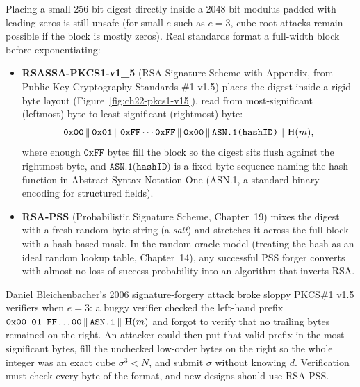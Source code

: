 \begin{trapbox}
Placing a small 256-bit digest directly inside a 2048-bit modulus padded with leading zeros is still unsafe (for small $e$ such as $e = 3$, cube-root attacks remain possible if the block is mostly zeros). Real standards format a full-width block before exponentiating:
\begin{itemize}
  \item \textbf{RSASSA-PKCS1-v1\_5} (RSA Signature Scheme with Appendix, from Public-Key Cryptography Standards \#1 v1.5) places the digest inside a rigid byte layout (Figure~\ref{fig:ch22-pkcs1-v15}), read from most-significant (leftmost) byte to least-significant (rightmost) byte:
  \[
    \texttt{0x00} \,\|\, \texttt{0x01} \,\|\, \texttt{0xFF}\cdots\texttt{0xFF} \,\|\, \texttt{0x00} \,\|\, \texttt{ASN.1(hashID)} \,\|\, \operatorname{H}(m),
  \]
  where enough $\texttt{0xFF}$ bytes fill the block so the digest sits flush against the rightmost byte, and $\texttt{ASN.1(hashID)}$ is a fixed byte sequence naming the hash function in Abstract Syntax Notation One (ASN.1, a standard binary encoding for structured fields).
  \item \textbf{RSA-PSS} (Probabilistic Signature Scheme, Chapter~19) mixes the digest with a fresh random byte string (a \emph{salt}) and stretches it across the full block with a hash-based mask. In the random-oracle model (treating the hash as an ideal random lookup table, Chapter~14), any successful PSS forger converts with almost no loss of success probability into an algorithm that inverts RSA.
\end{itemize}
Daniel Bleichenbacher's 2006 signature-forgery attack broke sloppy PKCS\#1 v1.5 verifiers when $e = 3$: a buggy verifier checked the left-hand prefix $\texttt{0x00 01 FF}\dots\texttt{00} \,\|\, \texttt{ASN.1} \,\|\, \operatorname{H}(m)$ and forgot to verify that no trailing bytes remained on the right. An attacker could then put that valid prefix in the most-significant bytes, fill the unchecked low-order bytes on the right so the whole integer was an exact cube $\sigma^3 < N$, and submit $\sigma$ without knowing $d$. Verification must check every byte of the format, and new designs should use RSA-PSS.
\end{trapbox}

